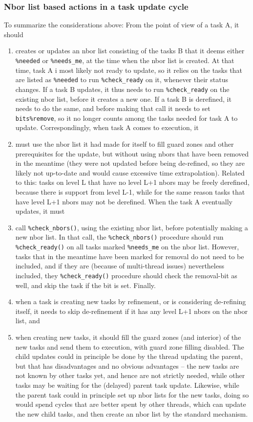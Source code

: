 \documentclass[paper=a4,fontsize=11pt]{scrartcl}
\numberwithin{equation}{section}		%
\numberwithin{figure}{section}			%
\numberwithin{table}{section}				%
\begin{document}
\subsubsection{Nbor list based actions in a task update cycle}
To summarize the considerations above: From the point of view of a task A, it should
\begin{enumerate}
    \item creates or updates an nbor list consisting of the tasks B that it deems either \verb|%needed| or \verb|%needs_me|, at the time when the nbor list is created.  At that time, task A i most likely not ready to update, so it relies on the tasks that are listed as \verb|%needed| to run \verb|%check_ready| on it, whenever their status changes.  If a task B updates, it thus needs to run \verb|%check_ready| on the existing nbor list, before it creates a new one.  If a task B is derefined, it needs to do the same, and before making that call it needs to set \verb|bits%remove|, so it no longer counts among the tasks needed for task A to update.   Correspondingly, when task A comes to execution, it
    \item must use the nbor list it had made for itself to fill guard zones and other prerequisites for the update, but without using nbors that have been removed in the meantime (they were not updated before being de-refined, so they are likely not up-to-date and would cause excessive time extrapolation).  Related to this: tasks on level L that have no level L+1 nbors may be freely derefined, because there is support from level L-1, while for the same reason tasks that have level L+1 nbors may not be derefined. When the task A eventually updates, it must
    \item call \verb|%check_nbors()|, using the existing nbor list, before potentially making a new nbor list. In that call, the \verb|%check_nbors()| procedure should run \verb|%check_ready()| on all tasks marked \verb|%needs_me| on the nbor list.  However, tasks that in the meantime have been marked for removal do not need to be included, and if they are (because of multi-thread issues) nevertheless included, they \verb|%check_ready()| procedure should check the removal-bit as well, and skip the task if the bit is set.  Finally.
    \item when a task is creating new tasks by refinement, or is considering de-refining itself, it needs to skip de-refinement if it has any level L+1 nbors on the nbor list, and 
    \item when creating new tasks, it should fill the guard zones (and interior) of the new tasks and send them to execution, with guard zone filling disabled. The child updates could in principle be done by the thread updating the parent, but that has disadvantages and no obvious advantages -- the new tasks are not known by other tasks yet, and hence are not strictly needed, while other tasks may be waiting for the (delayed) parent task update.   Likewise, while the parent task could in principle set up nbor lists for the new tasks, doing so would spend cycles that are better spent by other threads, which can update the new child tasks, and then create an nbor list by the standard mechanism.

\end{enumerate}
\end{document}
